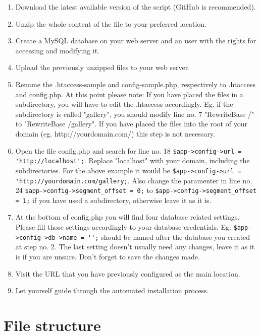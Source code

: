 \documentclass[a4paper,12pt,oneside]{article} %
\begin{document}
\begin{enumerate}
\item Download the latest available version of the script (GitHub is recommended).
\item Unzip the whole content of the file to your preferred location.
\item Create a MySQL database on your web server and an user with the rights for accessing and modifying it.
\item Upload the previously unzipped files to your web server.
\item Rename the .htaccess-sample and config-sample.php, respectively to .htaccess and config.php.
At this point please note: If you have placed the files in a subdirectory, you will have to edit the .htaccess accordingly.
Eg. if the subdirectory is called "gallery", you should modify line no. 7 "RewriteBase /" to "RewriteBase /gallery".
If you have placed the files into the root of your domain (eg. http://yourdomain.com/) this step is not necessary.
\item Open the file config.php and search for line no. 18 \lstinline{$app->config->url = 'http://localhost';}. Replace "localhost" with
your domain, including the subdirectories. For the above example it would be \lstinline{$app->config->url = 'http://yourdomain.com/gallery;}.
Also change the paramenter in line no. 24 \lstinline{$app->config->segment_offset = 0;} to \lstinline{$app->config->segment_offset = 1;} if you have used a subdirectory, otherwise leave it as it is.
\item At the bottom of config.php you will find four database related settings. Please fill those settings accordingly to your database credentials.
Eg. \lstinline{$app->config->db->name = '';} should be named after the database you created at step no. 2.
The last setting doesn't usually need any changes, leave it as it is if you are unsure. Don't forget to save the changes made.
\item Visit the URL that you have previously configured as the main location.
\item Let yourself guide through the automated installation process.
\end{enumerate}


\newpage

\section{File structure}
\end{document}
